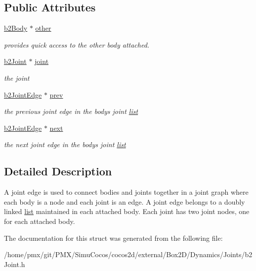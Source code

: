 \subsection*{Public Attributes}
\begin{DoxyCompactItemize}
\item 
\mbox{\label{structb2JointEdge_a8db4ad0cfcf28da120403237a66e3448}} 
\hyperlink{classb2Body}{b2\+Body} $\ast$ \hyperlink{structb2JointEdge_a8db4ad0cfcf28da120403237a66e3448}{other}
\begin{DoxyCompactList}\small\item\em provides quick access to the other body attached. \end{DoxyCompactList}\item 
\mbox{\label{structb2JointEdge_a14858c9a21315c184c39524b00ed4ea5}} 
\hyperlink{classb2Joint}{b2\+Joint} $\ast$ \hyperlink{structb2JointEdge_a14858c9a21315c184c39524b00ed4ea5}{joint}
\begin{DoxyCompactList}\small\item\em the joint \end{DoxyCompactList}\item 
\mbox{\label{structb2JointEdge_abb1a3fbe7a53e72425491d8bf03ab2fa}} 
\hyperlink{structb2JointEdge}{b2\+Joint\+Edge} $\ast$ \hyperlink{structb2JointEdge_abb1a3fbe7a53e72425491d8bf03ab2fa}{prev}
\begin{DoxyCompactList}\small\item\em the previous joint edge in the body\textquotesingle{}s joint \hyperlink{protocollist-p}{list} \end{DoxyCompactList}\item 
\mbox{\label{structb2JointEdge_a1c16b48777e9e25b3056f4b3713ab67a}} 
\hyperlink{structb2JointEdge}{b2\+Joint\+Edge} $\ast$ \hyperlink{structb2JointEdge_a1c16b48777e9e25b3056f4b3713ab67a}{next}
\begin{DoxyCompactList}\small\item\em the next joint edge in the body\textquotesingle{}s joint \hyperlink{protocollist-p}{list} \end{DoxyCompactList}\end{DoxyCompactItemize}


\subsection{Detailed Description}
A joint edge is used to connect bodies and joints together in a joint graph where each body is a node and each joint is an edge. A joint edge belongs to a doubly linked \hyperlink{protocollist-p}{list} maintained in each attached body. Each joint has two joint nodes, one for each attached body. 

The documentation for this struct was generated from the following file\+:\begin{DoxyCompactItemize}
\item 
/home/pmx/git/\+P\+M\+X/\+Simu\+Cocos/cocos2d/external/\+Box2\+D/\+Dynamics/\+Joints/b2\+Joint.\+h\end{DoxyCompactItemize}
